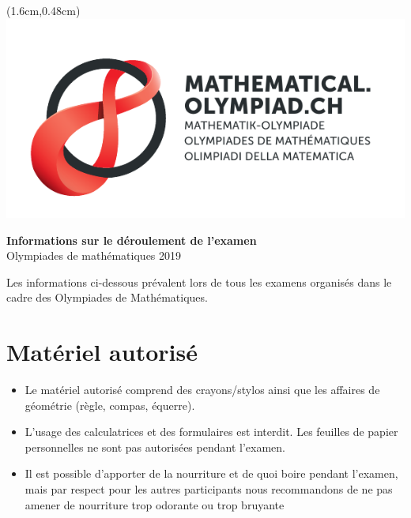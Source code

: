 \documentclass[12pt,a4paper]{article}
\begin{document}
\thispagestyle{empty}

\begin{textblock*}{\paperwidth}(1.6cm,0.48cm) %
\includegraphics[scale=0.67]{Logo_Mathematik_CMYK.pdf}
\end{textblock*}

\vspace*{2cm}

\begin{center}
\Huge{\textbf{Informations sur le déroulement de l'examen}}\\
\large{Olympiades de mathématiques 2019}
\end{center}

\bigskip

Les informations ci-dessous prévalent lors de tous les examens organisés dans le cadre des Olympiades de Mathématiques.

\section{Matériel autorisé}
\begin{itemize}
	\item Le matériel autorisé comprend des crayons/stylos ainsi que les affaires de géométrie (règle, compas, équerre).
	
	\item L'usage des calculatrices et des formulaires est interdit. Les feuilles de papier personnelles ne sont pas autorisées pendant l'examen.
	
	\item Il est possible d'apporter de la nourriture et de quoi boire pendant l'examen, mais par respect pour les autres participants nous recommandons de ne pas amener de nourriture trop odorante ou trop bruyante
\end{itemize}
\end{document}
